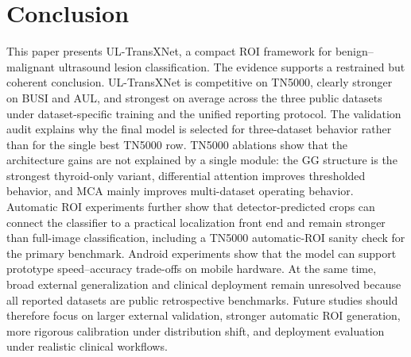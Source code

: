 \section{Conclusion}
\label{sec:conclusion}
This paper presents UL-TransXNet, a compact ROI framework for benign--malignant ultrasound lesion classification. The evidence supports a restrained but coherent conclusion. UL-TransXNet is competitive on TN5000, clearly stronger on BUSI and AUL, and strongest on average across the three public datasets under dataset-specific training and the unified reporting protocol. The validation audit explains why the final model is selected for three-dataset behavior rather than for the single best TN5000 row. TN5000 ablations show that the architecture gains are not explained by a single module: the GG structure is the strongest thyroid-only variant, differential attention improves thresholded behavior, and MCA mainly improves multi-dataset operating behavior. Automatic ROI experiments further show that detector-predicted crops can connect the classifier to a practical localization front end and remain stronger than full-image classification, including a TN5000 automatic-ROI sanity check for the primary benchmark. Android experiments show that the model can support prototype speed--accuracy trade-offs on mobile hardware. At the same time, broad external generalization and clinical deployment remain unresolved because all reported datasets are public retrospective benchmarks. Future studies should therefore focus on larger external validation, stronger automatic ROI generation, more rigorous calibration under distribution shift, and deployment evaluation under realistic clinical workflows.
